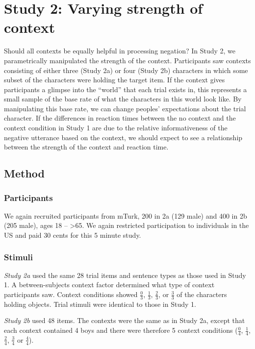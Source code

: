\documentclass[10pt,letterpaper]{article}
\begin{document}
\section{Study 2: Varying strength of context}

Should all contexts be equally helpful in processing negation? In Study 2, we parametrically manipulated the strength of the context.  Participants saw contexts consisting of either three (Study 2a) or four (Study 2b) characters in which some subset of the characters were holding the target item.  If the context gives participants a glimpse into the ``world'' that each trial exists in, this represents a small sample of the base rate of what the characters in this world look like.  By manipulating this base rate, we can change peoples' expectations about the trial character.  If the differences in reaction times between the no context and the context condition in Study 1 are due to the relative informativeness of the negative utterance based on the context, we should expect to see a relationship between the strength of the context and reaction time. 

\subsection{Method}

\subsubsection{Participants} 

We again recruited participants from mTurk, 200 in 2a (129 male) and  400 in 2b (205 male), ages 18 -- \textgreater65. We again restricted participation to individuals in the US and paid 30 cents for this 5 minute study.  

\subsubsection{Stimuli}

\emph{Study 2a} used the same 28 trial items and sentence types as those used in Study 1.  A between-subjects context factor determined what type of context participants saw.  Context conditions showed $\frac{0}{3}$, $\frac{1}{3}$, $\frac{2}{3}$, or $\frac{3}{3}$ of the characters holding objects.  Trial stimuli were identical to those in Study 1.  

\emph{Study 2b} used 48 items.  The contexts were the same as in Study 2a, except that each context contained 4 boys and there were therefore 5 context conditions ($\frac{0}{4}$, $\frac{1}{4}$, $\frac{2}{4}$, $\frac{3}{4}$ or $\frac{4}{4}$).  
\end{document}
